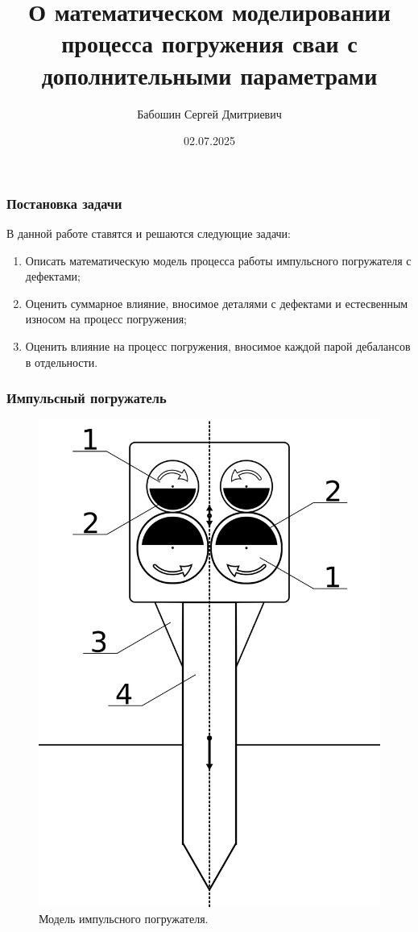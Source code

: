 \documentclass{beamer}
\title{О математическом моделировании процесса погружения сваи с дополнительными параметрами}
\date{02.07.2025}
\author{Бабошин Сергей Дмитриевич}
\begin{document}
    \frame{\titlepage}

    \begin{frame}
        \frametitle{Постановка задачи}
        В данной работе ставятся и решаются следующие задачи:
        \begin{enumerate}
            \item Описать математическую модель процесса работы импульсного погружателя с дефектами;
            \item Оценить суммарное влияние, вносимое деталями с дефектами и естесвенным износом на процесс погружения;
            \item Оценить влияние на процесс погружения, вносимое каждой парой дебалансов в отдельности.
        \end{enumerate}
    \end{frame}

    \begin{frame}
        \frametitle{Импульсный погружатель}
        \begin{figure}
            \includegraphics[width=0.4\linewidth]{pogruzhatel-2}
            \caption{Модель импульсного погружателя.}
        \end{figure}
    \end{frame}
\end{document}
